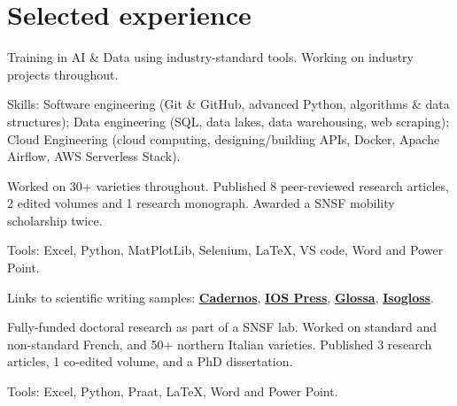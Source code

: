 \documentclass[]{plushcv}
\begin{document}
\begin{minipage}[t]{0.70\textwidth} 



\section{Selected experience}

Training in AI \& Data using industry-standard tools. Working on industry projects throughout.
\sectionsep
\sectionsep
\begin{tightemize}
\item Skills: Software engineering (Git \& GitHub, advanced Python, algorithms \& data structures); Data engineering (SQL, data lakes, data warehousing, web scraping);
Cloud Engineering (cloud computing, designing/building APIs, Docker, Apache Airflow, AWS Serverless Stack).
\end{tightemize}
\sectionsep

Worked on 30+ varieties throughout. Published 8 peer-reviewed research articles, 2 edited volumes and 1 research monograph. Awarded a SNSF mobility scholarship twice.
\sectionsep
\begin{tightemize}
\item Tools: Excel, Python, MatPlotLib, Selenium, LaTeX, VS code, Word and Power Point.
\item Links to scientific writing samples: \href{https://periodicos.unb.br/index.php/cs/article/view/40559/33149}{\textbf{Cadernos}}, \href{https://ebooks.iospress.nl/doi/10.3233/SHTI220702}{\textbf{IOS Press}}, \href{https://doi.org/10.16995/glossa.5714}{\textbf{Glossa}}, \href{https://doi.org/10.5565/rev/isogloss.108}{\textbf{Isogloss}}.
\end{tightemize}
\sectionsep

Fully-funded doctoral research as part of a SNSF lab. Worked on standard and non-standard French, and 50+ northern Italian varieties. Published 3 research articles, 1 co-edited volume, and a PhD dissertation.
\begin{tightemize}
\item Tools: Excel, Python, Praat, LaTeX, Word and Power Point.
\end{tightemize}
\sectionsep


\end{minipage}
\end{document}
